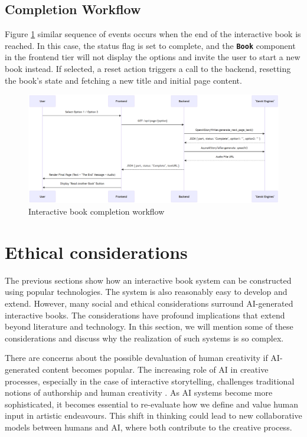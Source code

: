 \documentclass[conference]{IEEEtran}
\begin{document}
	\subsection{Completion Workflow}
	
	Figure \ref{fig:img-ari3333-completion-workflow} similar sequence of events occurs when the end of the interactive book is reached. In this case, the status flag is set to complete, and the \textbf{\texttt{Book}} component in the frontend tier will not display the options and invite the user to start a new book instead. If selected, a reset action triggers a call to the backend, resetting the book's state and fetching a new title and initial page content.
	
	\begin{figure}[H]
		\centering
		\includegraphics[width=0.7\linewidth]{img/img-ARI3333-completion-workflow}
		\caption{Interactive book completion workflow}
		\label{fig:img-ari3333-completion-workflow}
	\end{figure}
	
	
	\section{Ethical considerations}
		
	The previous sections show how an interactive book system can be constructed using popular technologies. The system is also reasonably easy to develop and extend. However, many social and ethical considerations surround AI-generated interactive books. The considerations have profound implications that extend beyond literature and technology. In this section, we will mention some of these considerations and discuss why the realization of such systems is so complex.
	
	There are concerns about the possible devaluation of human creativity if AI-generated content becomes popular. The increasing role of AI in creative processes, especially in the case of interactive storytelling, challenges traditional notions of authorship and human creativity \cite{udhayakumarexploring}. As AI systems become more sophisticated, it becomes essential to re-evaluate how we define and value human input in artistic endeavours. This shift in thinking could lead to new collaborative models between humans and AI, where both contribute to the creative process\cite{udhayakumarexploring}.
		
\end{document}
